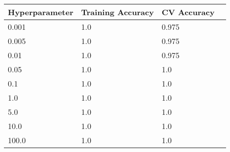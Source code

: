 \def\arraystretch{1.25}
\begin{center}
{\small
\begin{tabular}{l l l c}
\hline
\hline
\textbf{Hyperparameter}&\textbf{Training Accuracy} & \textbf{CV Accuracy}\\
\hline
\hline
0.001&1.0&0.975\\
0.005&1.0&0.975\\
0.01&1.0&0.975\\
0.05&1.0&1.0\\
0.1&1.0&1.0\\
1.0&1.0&1.0\\
5.0&1.0&1.0\\
10.0&1.0&1.0\\
100.0&1.0&1.0\\
\hline
\end{tabular}

}
\end{center}